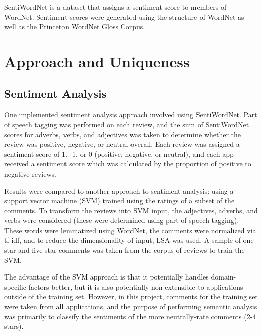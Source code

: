 \documentclass{acm_proc_article-sp}
\begin{document}
SentiWordNet is a dataset that assigns a sentiment score to members of WordNet.  Sentiment scores were generated using the structure of WordNet as well as the Princeton WordNet Gloss Corpus.


\section{Approach and Uniqueness}

\subsection{Sentiment Analysis}

One implemented sentiment analysis approach involved using SentiWordNet.  Part of speech tagging was performed on each review, and the sum of SentiWordNet scores for adverbs, verbs, and adjectives was taken to determine whether the review was positive, negative, or neutral overall.  Each review was assigned a sentiment score of 1, -1, or 0 (positive, negative, or neutral), and each app received a sentiment score which was calculated by the proportion of positive to negative reviews.

Results were compared to another approach to sentiment analysis: using a support vector machine (SVM) trained using the ratings of a subset of the comments.  To transform the reviews into SVM input, the adjectives, adverbs, and verbs were considered (these were determined using part of speech tagging).  These words were lemmatized using WordNet, the comments were normalized via tf-idf, and to reduce the dimensionality of input, LSA was used.  A sample of one-star and five-star comments was taken from the corpus of reviews to train the SVM.

The advantage of the SVM approach is that it potentially handles domain-specific factors better, but it is also potentially non-extensible to applications outside of the training set.  However, in this project, comments for the training set were taken from all applications, and the purpose of performing semantic analysis was primarily to classify the sentiments of the more neutrally-rate comments (2-4 stars).
\end{document}
